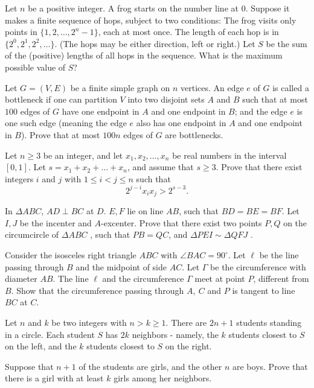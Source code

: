 \documentclass[11pt]{scrartcl}
\begin{document}
\begin{problem}[1302548092028853470]
Let $n$ be a positive integer. A frog starts on the number line at $0$. Suppose it makes a finite sequence of hops, subject to two conditions:
The frog visits only points in $\{1, 2, \dots, 2^n-1\}$, each at most once.
The length of each hop is in $\{2^0, 2^1, 2^2, \dots\}$. (The hops may be either direction, left or right.)
Let $S$ be the sum of the (positive) lengths of all hops in the sequence. What is the maximum possible value of $S$?
\end{problem}
\begin{problem}[472882074231586]
Let $G = (V, E)$ be a finite simple graph on $n$ vertices. An edge $e$ of $G$ is called a bottleneck if one can partition $V$ into two disjoint sets $A$ and $B$ such that
at most $100$ edges of $G$ have one endpoint in $A$ and one endpoint in $B$; and
the edge $e$ is one such edge (meaning the edge $e$ also has one endpoint in $A$ and one endpoint in $B$).
Prove that at most $100n$ edges of $G$ are bottlenecks.
\end{problem}
\begin{problem}[7550072974614174968]
Let $n \geqslant 3$ be an integer, and let $x_1,x_2,\ldots,x_n$ be real numbers in the interval $[0,1]$. Let $s=x_1+x_2+\ldots+x_n$, and assume that $s \geqslant 3$. Prove that there exist integers $i$ and $j$ with $1 \leqslant i<j \leqslant n$ such that
\[2^{j-i}x_ix_j>2^{s-3}.\]
\end{problem}
\begin{problem}[8402748184217471405]
In $\Delta ABC$, $AD \perp BC$ at $D$. $E,F$ lie on line $AB$, such that $BD=BE=BF$. Let $I,J$ be the incenter and $A$-excenter. Prove that there exist two points $P,Q$ on the circumcircle of $\Delta ABC$ , such that $PB=QC$, and $\Delta PEI \sim \Delta QFJ$ .
\end{problem}
\begin{problem}[4576482737766940742]
Consider the isosceles right triangle $ABC$ with $\angle BAC = 90^\circ$. Let $\ell$ be the line passing through $B$ and the midpoint of side $AC$. Let $\Gamma$ be the circumference with diameter $AB$. The line $\ell$ and the circumference $\Gamma$ meet at point $P$, different from $B$. Show that the circumference passing through $A,\ C$ and $P$ is tangent to line $BC$ at $C$.
\end{problem}
\begin{problem}[3866807698726339637]
Let $n$ and $k$ be two integers with $n>k\geqslant 1$. There are $2n+1$ students standing in a circle. Each student $S$ has $2k$ neighbors - namely, the $k$ students closest to $S$ on the left, and the $k$ students closest to $S$ on the right.

Suppose that $n+1$ of the students are girls, and the other $n$ are boys. Prove that there is a girl with at least $k$ girls among her neighbors.
\end{problem}
\end{document}
